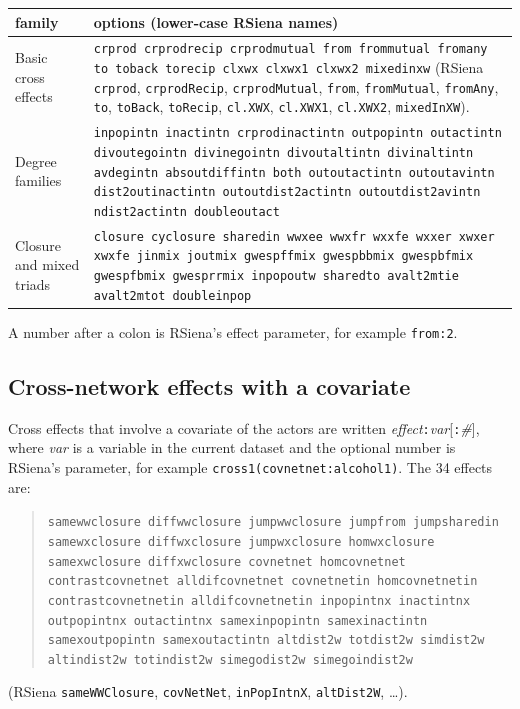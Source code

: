 \begin{longtable}{@{}p{3.2cm}p{10.6cm}@{}}
\toprule
family & options (lower-case RSiena names) \\
\midrule
\endhead
Basic cross effects & \texttt{crprod crprodrecip crprodmutual from frommutual fromany to toback torecip clxwx clxwx1 clxwx2 mixedinxw} (RSiena \texttt{crprod}, \texttt{crprodRecip}, \texttt{crprodMutual}, \texttt{from}, \texttt{fromMutual}, \texttt{fromAny}, \texttt{to}, \texttt{toBack}, \texttt{toRecip}, \texttt{cl.XWX}, \texttt{cl.XWX1}, \texttt{cl.XWX2}, \texttt{mixedInXW}). \\
Degree families & \texttt{inpopintn inactintn crprodinactintn outpopintn outactintn divoutegointn divinegointn divoutaltintn divinaltintn avdegintn absoutdiffintn both outoutactintn outoutavintn dist2outinactintn outoutdist2actintn outoutdist2avintn ndist2actintn doubleoutact} \\
Closure and mixed triads & \texttt{closure cyclosure sharedin wwxee wwxfr wxxfe wxxer xwxer xwxfe jinmix joutmix gwespffmix gwespbbmix gwespbfmix gwespfbmix gwesprrmix inpopoutw sharedto avalt2mtie avalt2mtot doubleinpop} \\
\bottomrule
\end{longtable}

A number after a colon is RSiena's effect parameter, for example \texttt{from:2}.

\subsection{Cross-network effects with a covariate}

Cross effects that involve a covariate of the actors are written \emph{effect}\texttt{:}\emph{var}[\texttt{:}\emph{\#}], where \emph{var} is a variable in the current dataset and the optional number is RSiena's parameter, for example \texttt{cross1(covnetnet:alcohol1)}. The 34 effects are:
\begin{quote}\small
\texttt{samewwclosure diffwwclosure jumpwwclosure jumpfrom jumpsharedin samewxclosure diffwxclosure jumpwxclosure homwxclosure samexwclosure diffxwclosure covnetnet homcovnetnet contrastcovnetnet alldifcovnetnet covnetnetin homcovnetnetin contrastcovnetnetin alldifcovnetnetin inpopintnx inactintnx outpopintnx outactintnx samexinpopintn samexinactintn samexoutpopintn samexoutactintn altdist2w totdist2w simdist2w altindist2w totindist2w simegodist2w simegoindist2w}
\end{quote}
(RSiena \texttt{sameWWClosure}, \texttt{covNetNet}, \texttt{inPopIntnX}, \texttt{altDist2W}, \dots).

